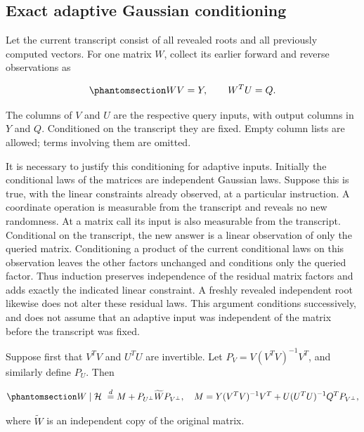 \documentclass[
  11pt,
]{article}
\theoremstyle{definition}
\theoremstyle{plain}
\theoremstyle{plain}
\theoremstyle{plain}
\theoremstyle{remark}
\begin{document}
\subsection{Exact adaptive Gaussian
conditioning}\label{sec-docs-special-data-limits-l3884}

Let the current transcript consist of all revealed roots and all
previously computed vectors. For one matrix \(W\), collect its earlier
forward and reverse observations as

\begin{equation}\protect\phantomsection\label{eq-docs-special-data-limits-l3887}{
WV=Y,\qquad W^TU=Q.
}\end{equation}

The columns of \(V\) and \(U\) are the respective query inputs, with
output columns in \(Y\) and \(Q\). Conditioned on the transcript they
are fixed. Empty column lists are allowed; terms involving them are
omitted.

It is necessary to justify this conditioning for adaptive inputs.
Initially the conditional laws of the matrices are independent Gaussian
laws. Suppose this is true, with the linear constraints already
observed, at a particular instruction. A coordinate operation is
measurable from the transcript and reveals no new randomness. At a
matrix call its input is also measurable from the transcript.
Conditional on the transcript, the new answer is a linear observation of
only the queried matrix. Conditioning a product of the current
conditional laws on this observation leaves the other factors unchanged
and conditions only the queried factor. Thus induction preserves
independence of the residual matrix factors and adds exactly the
indicated linear constraint. A freshly revealed independent root
likewise does not alter these residual laws. This argument conditions
successively, and does not assume that an adaptive input was independent
of the matrix before the transcript was fixed.

Suppose first that \(V^TV\) and \(U^TU\) are invertible. Let
\(P_V=V(V^TV)^{-1}V^T\), and similarly define \(P_U\). Then

\begin{equation}\protect\phantomsection\label{eq-docs-special-data-limits-l3896}{
W\mid\mathcal H\ \overset d=
M+P_{U^\perp}\widetilde W P_{V^\perp},
\quad
M=Y(V^TV)^{-1}V^T
 +U(U^TU)^{-1}Q^TP_{V^\perp},
}\end{equation}

where \(\widetilde W\) is an independent copy of the original matrix.
\end{document}
